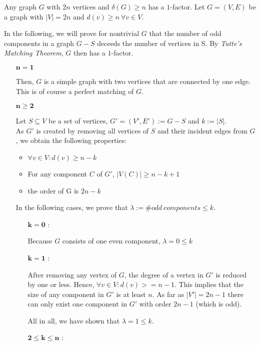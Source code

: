 \documentclass[a4paper]{article}
\begin{document}
	\begin{solution}{12}
		\begin{theorem}{Any graph $G$ with $2n$ vertices and $\delta(G) \geq n$ has a $1$-factor.}
			Let $G=(V,E)$ be a graph with $|V| = 2n$ and $d(v) \geq n \: \forall v \in V$.

			In the following, we will prove for nontrivial $G$ that the number of odd components in a graph $G - S$ deceeds the number of vertices in S. By \emph{Tutte's Matching Theorem}, $G$ then has a $1$-factor.
			\begin{itemize}
				\item [$\mathbf{n = 1}$]

					Then, $G$ is a simple graph with two vertices that are connected by one edge. This is of course a perfect matching of $G$.
			
				\item [$\mathbf{n \geq 2}$]

					Let $S \subseteq V$ be a set of vertices, $G' = (V', E') := G - S$ and $k := |S|$.\\
					As $G'$ is created by removing all vertices of $S$ and their incident edges from $G$, we obtain the following properties: 
					\begin{itemize}
						\item $\forall v \in V: d(v) \geq n - k$
						\item For any component $C$ of $G'$, $|V(C)| \geq n-k+1$
						\item the order of G is $2n-k$
					\end{itemize}
					
					In the following cases, we prove that $\lambda:=\#odd\ components \leq k$.
					\begin{itemize}
						\item[$\mathbf{k=0}$]:

							Because $G$ consists of one even component, $\lambda=0 \leq k$
						\item[$\mathbf{k=1}$]:

							After removing any vertex of $G$, the degree of a vertex in $G'$ is reduced by one or less. Hence, $\forall v \in V: d(v) >= n-1$. This implies that the size of any component in $G'$ is at least $n$. As far as $|V'|=2n-1$ there can only exist one component in $G'$ with order $2n-1$ (which is odd).

							All in all, we have shown that $\lambda=1 \leq k$.
						
						\item[$\mathbf{2\leq k \leq n}$]:


\end{itemize}
\end{itemize}
\end{theorem}
\end{solution}
\end{document}
